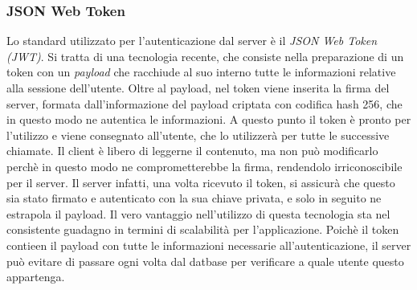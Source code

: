 \subsubsection{JSON Web Token}
Lo standard utilizzato per l'autenticazione dal server è il \emph{JSON Web Token (JWT)}. Si tratta di una tecnologia recente, che consiste nella preparazione di un token con un \textit{payload} che racchiude al suo interno tutte le informazioni relative alla sessione dell'utente. Oltre al payload, nel token viene inserita la firma del server, formata dall'informazione del payload criptata con codifica hash 256, che in questo modo ne autentica le informazioni. A questo punto il token è pronto per l'utilizzo e viene consegnato all'utente, che lo utilizzerà per tutte le successive chiamate. Il client è libero di leggerne il contenuto, ma non può modificarlo perchè in questo modo ne comprometterebbe la firma, rendendolo irriconoscibile per il server. Il server infatti, una volta ricevuto il token, si assicurà che questo sia stato firmato e autenticato con la sua chiave privata, e solo in seguito ne estrapola il payload. Il vero vantaggio nell'utilizzo di questa tecnologia sta nel consistente guadagno in termini di scalabilità per l'applicazione. Poichè il token contieen il payload con tutte le informazioni necessarie all'autenticazione, il server può evitare di passare ogni volta dal datbase per verificare a quale utente questo appartenga.

